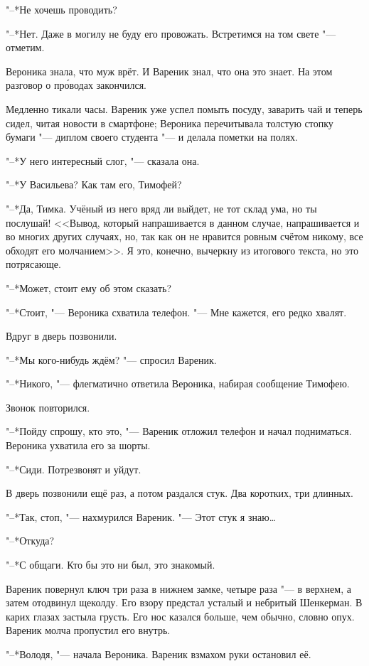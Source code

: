"--*Не хочешь проводить?

"--*Нет.
Даже в могилу не буду его провожать.
Встретимся на том свете "--- отметим.

Вероника знала, что муж врёт.
И Вареник знал, что она это знает.
На этом разговор о пр\'оводах закончился.

Медленно тикали часы.
Вареник уже успел помыть посуду, заварить чай и теперь сидел, читая новости в смартфоне;
Вероника перечитывала толстую стопку бумаги "--- диплом своего студента "--- и делала пометки на полях.

"--*У него интересный слог, "--- сказала она.

"--*У Васильева?
Как там его, Тимофей?

"--*Да, Тимка.
Учёный из него вряд ли выйдет, не тот склад ума, но ты послушай!
<<Вывод, который напрашивается в данном случае, напрашивается и во многих других случаях, но, так как он не нравится ровным счётом никому, все обходят его молчанием>>.
Я это, конечно, вычеркну из итогового текста, но это потрясающе.

"--*Может, стоит ему об этом сказать?

"--*Стоит, "--- Вероника схватила телефон.
"--- Мне кажется, его редко хвалят.

Вдруг в дверь позвонили.

"--*Мы кого-нибудь ждём? "--- спросил Вареник.

"--*Никого, "--- флегматично ответила Вероника, набирая сообщение Тимофею.

Звонок повторился.

"--*Пойду спрошу, кто это, "--- Вареник отложил телефон и начал подниматься.
Вероника ухватила его за шорты.

"--*Сиди.
Потрезвонят и уйдут.

В дверь позвонили ещё раз, а потом раздался стук.
Два коротких, три длинных.

"--*Так, стоп, "--- нахмурился Вареник.
"--- Этот стук я знаю\ldots{}

"--*Откуда?

"--*С общаги.
Кто бы это ни был, это знакомый.

Вареник повернул ключ три раза в нижнем замке, четыре раза "--- в верхнем, а затем отодвинул щеколду.
Его взору предстал усталый и небритый Шенкерман.
В карих глазах застыла грусть.
Его нос казался больше, чем обычно, словно опух.
Вареник молча пропустил его внутрь.

"--*Володя, "--- начала Вероника.
Вареник взмахом руки остановил её.

